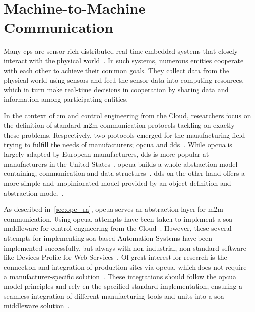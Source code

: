\documentclass[
a4paper,
twoside,
headsepline,
cleardoublepage=empty,
parskip=half,
draft=false
]{scrbook}
\begin{document}
		\section{Machine-to-Machine Communication}\label{sec:machine_to_machine_communication}
			
			Many \gls{cps} are sensor-rich distributed real-time embedded systems that closely interact with the physical world~\cite{kang2012rdds}. 
			In such systems, numerous entities cooperate with each other to achieve their common goals. 
			They collect data from the physical world using sensors and feed the sensor data into computing resources, which in turn make real-time decisions in cooperation by sharing data and information among participating entities.
			
			In the context of \gls{cm} and control engineering from the Cloud, researchers focus on the definition of standard \gls{m2m} communication protocols tackling on exactly these problems.
			Respectively, two protocols emerged for the manufacturing field trying to fulfill the needs of manufacturers; \gls{opcua} and \gls{dds}~\cite{jazdi2014cyber}.
			While \gls{opcua} is largely adapted by European manufacturers, \gls{dds} is more popular at manufacturers in the United States~\cite{schleipen2008opc}.
			\gls{opcua} builds a whole abstraction model containing, communication and data structures~\cite{candido2010soa}.
			\gls{dds} on the other hand offers a more simple and unopinionated model provided by an object definition and abstraction model~\cite{candido2010soa}.
			
			As described in~\cref{sec:opc_ua}, \gls{opcua} serves an abstraction layer for \gls{m2m} communication. Using \gls{opcua}, attempts have been taken to implement a \gls{soa} middleware for control engineering from the Cloud~\cite{melik2012towards}.
			However, these several attempts for implementing \gls{soa}-based Automation Systems have been implemented successfully, but always with non-industrial, non-standard software like Devices Profile for Web Services~\cite{melik2012towards}.
			Of great interest for research is the connection and integration of production sites via \gls{opcua}, which does not require a manufacturer-specific solution~\cite{melik2012towards}. These integrations should follow the \gls{opcua} model principles and rely on the specified standard implementation, ensuring a seamless integration of different manufacturing tools and units into a \gls{soa} middleware solution~\cite{imtiaz2013scalability}.
			
\end{document}
